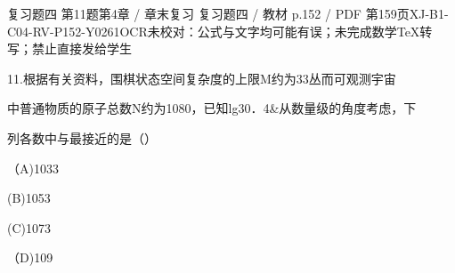 \begin{bankitem}{复习题四 第11题}{第4章 / 章末复习 复习题四 / 教材 p.152 / PDF 第159页}{XJ-B1-C04-RV-P152-Y0261}{OCR未校对：公式与文字均可能有误；未完成数学TeX转写；禁止直接发给学生}
\begin{ocrdraft}
\par
11.根据有关资料，围棋状态空间复杂度的上限M约为33丛而可观测宇宙
\par
中普通物质的原子总数N约为1080，已知lg30．4\&从数量级的角度考虑，下
\par
列各数中与最接近的是（）
\par
（A)1033
\par
(B)1053
\par
(C)1073
\par
（D)109
\end{ocrdraft}
\end{bankitem}
